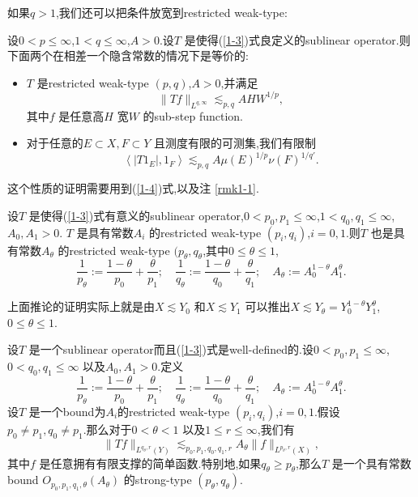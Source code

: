 如果$q>1$,我们还可以把条件放宽到restricted weak-type:
\begin{proposition}\label{prp1-1}
  设$0<p\le \infty$,$1<q\le \infty$,$A>0$.设$T$ 是使得(\ref{1-3})式良定义的sublinear operator.则下面两个在相差一个隐含常数的情况下是等价的:
  \begin{itemize}
    \item $T$ 是restricted weak-type $(p,q)$,$A>0$,并满足
       \begin{equation}
        \|Tf\|_{L^{q,\infty}}\lesssim_{p,q}AHW^{1 /p},
      \end{equation}
      其中$f$ 是任意高$H$ 宽$W$ 的sub-step function.
    \item 对于任意的$E\subset X,F\subset Y$ 且测度有限的可测集,我们有限制
      \[
	\left<|T 1_E|,1_F \right>\lesssim_{p,q}A\mu(E)^{1 /p}\nu(F)^{1 /q'}.
      \] 
    \end{itemize}
\end{proposition}
这个性质的证明需要用到(\ref{1-4})式,以及注 \ref{rmk1-1}.

\begin{corollary}
  设$T$ 是使得(\ref{1-3})式有意义的sublinear operator,$0<p_0,p_1\le \infty$,$1<q_0,q_1\le \infty$,$A_0,A_1>0$. $T$ 是具有常数$A_i$ 的restricted weak-type $(p_i,q_i)$,$i=0,1$.则$T$ 也是具有常数$A_\theta$ 的restricted weak-type $(p_\theta,q_\theta$,其中$0\le \theta\le 1$,
   \[
   \frac{1}{p_\theta}:=\frac{1-\theta}{p_0}+\frac{\theta}{p_1};\quad \frac{1}{q_\theta}:=\frac{1-\theta}{q_0}+\frac{\theta}{q_1};\quad A_\theta:=A_0^{1-\theta}A_1^{\theta}.
   \]  
\end{corollary}
上面推论的证明实际上就是由$X\lesssim Y_0$ 和$X\lesssim Y_1$ 可以推出$X\lesssim Y_\theta=Y_0^{1-\theta}Y_1^{\theta}$,$0\le \theta\le 1$.

\begin{theorem}
  设$T$ 是一个sublinear operator而且(\ref{1-3})式是well-defined的.设$0<p_0,p_1\le \infty$,$0<q_0,q_1\le \infty$ 以及$A_0,A_1>0$.定义
  \[
    \frac{1}{p_\theta}:=\frac{1-\theta}{p_0}+\frac{\theta}{p_1};\quad \frac{1}{q_\theta}:=\frac{1-\theta}{q_0}+\frac{\theta}{q_1};\quad A_\theta:=A_0^{1-\theta}A_1^{\theta}.
  \] 
  设$T$ 是一个bound为$A_i$的restricted weak-type $(p_i,q_i)$,$i=0,1$.假设 $p_0\neq p_1,q_0\neq p_1$.那么对于$0<\theta<1$ 以及$1\le r\le \infty$,我们有
  \[
    \|Tf\|_{L^{q_\theta,r}(Y)}\lesssim_{p_0,p_1,q_0,q_1,r} A_{\theta}\|f\|_{L^{p_\theta,r}(X)},
  \] 
  其中$f$ 是任意拥有有限支撑的简单函数.特别地,如果$q_\theta\ge p_\theta$,那么$T$ 是一个具有常数bound $O_{p_0,p_1,q_1,\theta}(A_\theta)$ 的strong-type $(p_\theta,q_\theta)$.
\end{theorem}

